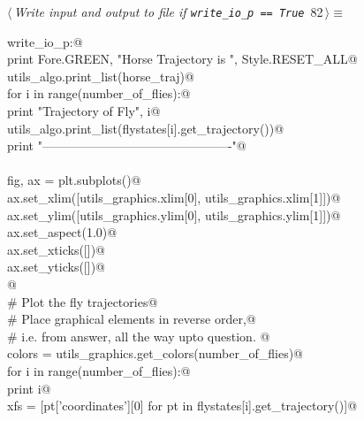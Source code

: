 \documentclass[11.5pt]{report}
\begin{document}
\vspace{-0.8cm} \newchunk 
\begin{flushleft} \small
\begin{minipage}{\linewidth}\label{scrap129}\raggedright\small
{} $\langle\,${\itshape Write input and output to file if \verb|write_io_p == True|}\nobreak\ {\footnotesize {82}}$\,\rangle\equiv$
\vspace{-1ex}
\begin{list}{}{} \item
\mbox{}\verb@if write_io_p:@\\
\mbox{}\verb@    print Fore.GREEN, "Horse Trajectory is ", Style.RESET_ALL@\\
\mbox{}\verb@    utils_algo.print_list(horse_traj)@\\
\mbox{}\verb@    for i in range(number_of_flies):@\\
\mbox{}\verb@           print "Trajectory of Fly", i@\\
\mbox{}\verb@           utils_algo.print_list(flystates[i].get_trajectory())@\\
\mbox{}\verb@           print "----------------------------------------------"@\\
\mbox{}\verb@@\\
\mbox{}\verb@    fig, ax =  plt.subplots()@\\
\mbox{}\verb@    ax.set_xlim([utils_graphics.xlim[0], utils_graphics.xlim[1]])@\\
\mbox{}\verb@    ax.set_ylim([utils_graphics.ylim[0], utils_graphics.ylim[1]])@\\
\mbox{}\verb@    ax.set_aspect(1.0)@\\
\mbox{}\verb@    ax.set_xticks([])@\\
\mbox{}\verb@    ax.set_yticks([])@\\
\mbox{}\verb@  @\\
\mbox{}\verb@    # Plot the fly trajectories@\\
\mbox{}\verb@    # Place graphical elements in reverse order,@\\
\mbox{}\verb@    # i.e. from answer, all the way upto question. @\\
\mbox{}\verb@    colors = utils_graphics.get_colors(number_of_flies)@\\
\mbox{}\verb@    for i in range(number_of_flies):@\\
\mbox{}\verb@       print i@\\
\mbox{}\verb@       xfs = [pt['coordinates'][0] for pt in flystates[i].get_trajectory()]@\\

\end{list}
\end{minipage}
\end{flushleft}
\end{document}

